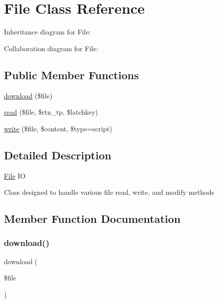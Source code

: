 \hypertarget{class_w_a_f_f_l_e_1_1_framework_1_1_i_o_1_1_file}{}\section{File Class Reference}
\label{class_w_a_f_f_l_e_1_1_framework_1_1_i_o_1_1_file}


Inheritance diagram for File\+:


Collaboration diagram for File\+:
\subsection*{Public Member Functions}
\begin{DoxyCompactItemize}
\item 
\hyperlink{class_w_a_f_f_l_e_1_1_framework_1_1_i_o_1_1_file_aafe286d7c8fb46b17af96b66734393c0}{download} (\$file)
\item 
\hyperlink{class_w_a_f_f_l_e_1_1_framework_1_1_i_o_1_1_file_abe1b4778c16b961777ab1aa25474995d}{read} (\$file, \$rtn\+\_\+tp, \$latchkey)
\item 
\hyperlink{class_w_a_f_f_l_e_1_1_framework_1_1_i_o_1_1_file_ad1346b1a0af3c4b9a5ced25b88e8f4ab}{write} (\$file, \$content, \$type=\textquotesingle{}script\textquotesingle{})
\end{DoxyCompactItemize}


\subsection{Detailed Description}
\hyperlink{class_w_a_f_f_l_e_1_1_framework_1_1_i_o_1_1_file}{File} IO

Class designed to handle various file read, write, and modify methods 

\subsection{Member Function Documentation}
\mbox{\label{class_w_a_f_f_l_e_1_1_framework_1_1_i_o_1_1_file_aafe286d7c8fb46b17af96b66734393c0}} 
\subsubsection{\texorpdfstring{download()}{download()}}
{\footnotesize\ttfamily download (\begin{DoxyParamCaption}\item[{}]{\$file }\end{DoxyParamCaption})}

